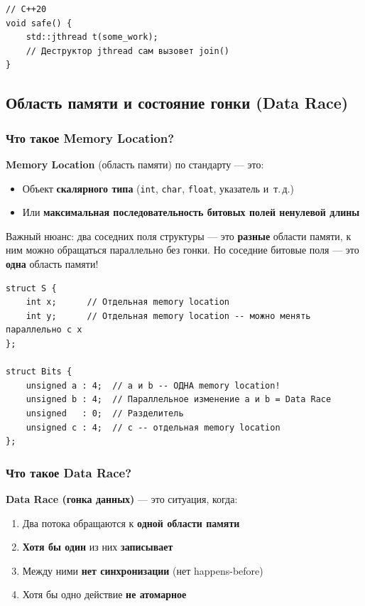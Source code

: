 \documentclass[a4paper,12pt]{article}
\begin{document}
\begin{lstlisting}
// C++20
void safe() {
    std::jthread t(some_work);
    // Деструктор jthread сам вызовет join()
}
\end{lstlisting}

\subsection{Область памяти и состояние гонки (Data Race)}

\subsubsection{Что такое Memory Location?}

\textbf{Memory Location} (область памяти) по стандарту --- это:
\begin{itemize}
    \item Объект \textbf{скалярного типа} (\texttt{int}, \texttt{char},
          \texttt{float}, указатель и~т.\,д.)
    \item Или \textbf{максимальная последовательность битовых полей ненулевой длины}
\end{itemize}

Важный нюанс: два соседних поля структуры --- это \textbf{разные} области памяти,
к ним можно обращаться параллельно без гонки. Но соседние битовые поля --- это
\textbf{одна} область памяти!

\begin{lstlisting}
struct S {
    int x;      // Отдельная memory location
    int y;      // Отдельная memory location -- можно менять параллельно с x
};

struct Bits {
    unsigned a : 4;  // a и b -- ОДНА memory location!
    unsigned b : 4;  // Параллельное изменение a и b = Data Race
    unsigned   : 0;  // Разделитель
    unsigned c : 4;  // c -- отдельная memory location
};
\end{lstlisting}

\subsubsection{Что такое Data Race?}

\textbf{Data Race (гонка данных)} --- это ситуация, когда:

\begin{enumerate}
    \item Два потока обращаются к \textbf{одной области памяти}
    \item \textbf{Хотя бы один} из них \textbf{записывает}
    \item Между ними \textbf{нет синхронизации} (нет happens-before)
    \item Хотя бы одно действие \textbf{не атомарное}
\end{enumerate}
\end{document}
